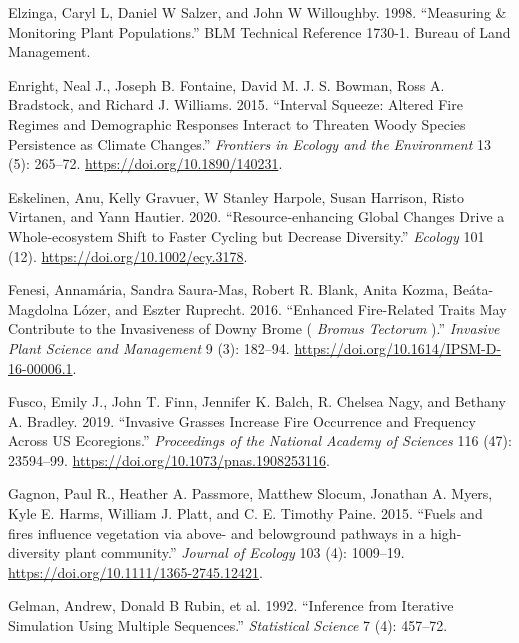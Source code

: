 \documentclass[
  12pt,
]{article}
\newlength{\cslhangindent}
\newlength{\cslentryspacingunit} %
\newenvironment{CSLReferences}[2] %
 {%
  \setlength{\parindent}{0pt}
  \ifodd #1
  \let\oldpar\par
  \def\par{\hangindent=\cslhangindent\oldpar}
  \fi
  \setlength{\parskip}{#2\cslentryspacingunit}
 }%
 {}
\begin{document}
\begin{CSLReferences}{1}{0}
\leavevmode{}%
Elzinga, Caryl L, Daniel W Salzer, and John W Willoughby. 1998.
{``Measuring \& {Monitoring} {Plant} {Populations}.''} BLM Technical
Reference 1730-1. Bureau of Land Management.

\leavevmode{}%
Enright, Neal J., Joseph B. Fontaine, David M. J. S. Bowman, Ross A.
Bradstock, and Richard J. Williams. 2015. {``Interval Squeeze: Altered
Fire Regimes and Demographic Responses Interact to Threaten Woody
Species Persistence as Climate Changes.''} \emph{Frontiers in Ecology
and the Environment} 13 (5): 265--72.
\url{https://doi.org/10.1890/140231}.

\leavevmode{}%
Eskelinen, Anu, Kelly Gravuer, W Stanley Harpole, Susan Harrison, Risto
Virtanen, and Yann Hautier. 2020. {``Resource‐enhancing Global Changes
Drive a Whole‐ecosystem Shift to Faster Cycling but Decrease
Diversity.''} \emph{Ecology} 101 (12).
\url{https://doi.org/10.1002/ecy.3178}.

\leavevmode{}%
Fenesi, Annamária, Sandra Saura-Mas, Robert R. Blank, Anita Kozma,
Beáta-Magdolna Lózer, and Eszter Ruprecht. 2016. {``Enhanced
{Fire}-{Related} {Traits} {May} {Contribute} to the {Invasiveness} of
{Downy} {Brome} ( \emph{{Bromus} Tectorum} ).''} \emph{Invasive Plant
Science and Management} 9 (3): 182--94.
\url{https://doi.org/10.1614/IPSM-D-16-00006.1}.

\leavevmode{}%
Fusco, Emily J., John T. Finn, Jennifer K. Balch, R. Chelsea Nagy, and
Bethany A. Bradley. 2019. {``Invasive Grasses Increase Fire Occurrence
and Frequency Across US Ecoregions.''} \emph{Proceedings of the National
Academy of Sciences} 116 (47): 23594--99.
\url{https://doi.org/10.1073/pnas.1908253116}.

\leavevmode{}%
Gagnon, Paul R., Heather A. Passmore, Matthew Slocum, Jonathan A. Myers,
Kyle E. Harms, William J. Platt, and C. E. Timothy Paine. 2015.
{``{Fuels and fires influence vegetation via above- and belowground
pathways in a high-diversity plant community}.''} \emph{Journal of
Ecology} 103 (4): 1009--19.
\url{https://doi.org/10.1111/1365-2745.12421}.

\leavevmode{}%
Gelman, Andrew, Donald B Rubin, et al. 1992. {``Inference from Iterative
Simulation Using Multiple Sequences.''} \emph{Statistical Science} 7
(4): 457--72.


\end{CSLReferences}
\end{document}
